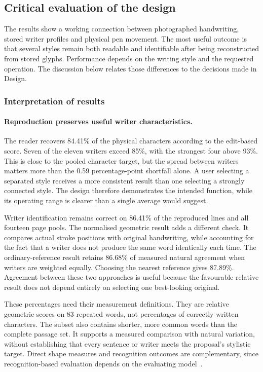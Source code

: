 \label{sec:discussion}
\subsection{Critical evaluation of the design}
\label{sec:dis-critical}
The results show a working connection between photographed handwriting, stored writer profiles and physical pen movement. The most useful outcome is that several styles remain both readable and identifiable after being reconstructed from stored glyphs. Performance depends on the writing style and the requested operation. The discussion below relates those differences to the decisions made in Design.

\subsubsection{Interpretation of results}
\label{sec:dis-interpretation}
\paragraph{Reproduction preserves useful writer characteristics.}
The reader recovers 84.41\% of the physical characters according to the edit-based score. Seven of the eleven writers exceed 85\%, with the strongest four above 93\%. This is close to the pooled character target, but the spread between writers matters more than the 0.59 percentage-point shortfall alone. A user selecting a separated style receives a more consistent result than one selecting a strongly connected style. The design therefore demonstrates the intended function, while its operating range is clearer than a single average would suggest.

Writer identification remains correct on 86.41\% of the reproduced lines and all fourteen page pools. The normalised geometric result adds a different check. It compares actual stroke positions with original handwriting, while accounting for the fact that a writer does not produce the same word identically each time. The ordinary-reference result retains 86.68\% of measured natural agreement when writers are weighted equally. Choosing the nearest reference gives 87.89\%. Agreement between these two approaches is useful because the favourable relative result does not depend entirely on selecting one best-looking original.

These percentages need their measurement definitions. They are relative geometric scores on 83 repeated words, not percentages of correctly written characters. The subset also contains shorter, more common words than the complete passage set. It supports a measured comparison with natural variation, without establishing that every sentence or writer meets the proposal's stylistic target. Direct shape measures and recognition outcomes are complementary, since recognition-based evaluation depends on the evaluating model~\cite[p.~2]{chen2022glyph}.

